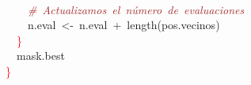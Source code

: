 \mbox{}\ \ \ \  \\
\mbox{}\ \ \ \ \textit{\textcolor{Brown}{\#\ Actualizamos\ el\ número\ de\ evaluaciones}} \\
\mbox{}\ \ \ \ n\textcolor{BrickRed}{.}eval\ \textcolor{BrickRed}{\textless{}-}\ n\textcolor{BrickRed}{.}eval\ \textcolor{BrickRed}{+}\ length\textcolor{BrickRed}{(}pos\textcolor{BrickRed}{.}vecinos\textcolor{BrickRed}{)} \\
\mbox{}\ \ \textcolor{Red}{\}} \\
\mbox{}\ \ mask\textcolor{BrickRed}{.}best \\
\mbox{}\textcolor{Red}{\}} \\
\mbox{}
